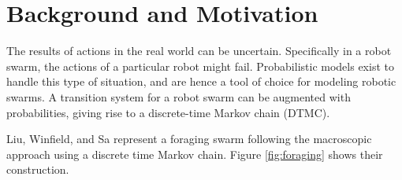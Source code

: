 \documentclass[11pt]{article}
\theoremstyle{definition}
\begin{document}
\section{Background and Motivation}
\label{sec:background-motivation}

The results of actions in the real world can be uncertain.
Specifically in a robot swarm, the actions of a particular robot might fail.
Probabilistic models exist to handle this type of situation, and are hence a
tool of choice for modeling robotic swarms.
A transition system for a robot swarm can be augmented with probabilities,
giving rise to a discrete-time Markov chain (DTMC).

Liu, Winfield, and Sa represent a foraging swarm following the macroscopic
approach using a discrete time Markov chain.
Figure \ref{fig:foraging} shows their construction.
\end{document}
